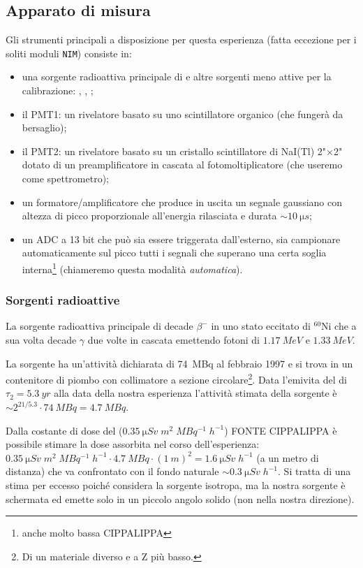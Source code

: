 \subsection{Apparato di misura}
Gli strumenti principali a disposizione per questa esperienza (fatta eccezione per i soliti moduli \texttt{NIM}) consiste in:
\begin{itemize}
	\item una sorgente radioattiva principale di \co\! e altre sorgenti meno attive per la calibrazione: \cs, \na, \am;
	\item il PMT1: un rivelatore basato su uno scintillatore organico (che fungerà da bersaglio);
	\item il PMT2: un rivelatore basato su un cristallo scintillatore di NaI(Tl) 2"$\times$2" dotato di un preamplificatore in cascata al fotomoltiplicatore (che useremo come spettrometro);
	\item un formatore/amplificatore che produce in uscita un segnale gaussiano con altezza di picco proporzionale all'energia rilasciata e durata $\sim \SI{10}{\micro s}$;
	\item un ADC a 13 bit che può sia essere triggerata dall'esterno, sia campionare automaticamente sul picco tutti i segnali che superano una certa soglia interna\footnote{anche molto bassa CIPPALIPPA} (chiameremo questa modalità \emph{automatica}).
\end{itemize}

\subsubsection{Sorgenti radioattive}
La sorgente radioattiva principale di \co\; decade $\beta^-$ in uno stato eccitato di $^{60}$Ni che a sua volta decade $\gamma$ due volte in cascata emettendo fotoni di $\SI{1.17}{MeV}$ e $\SI{1.33}{MeV}$.

La sorgente ha un'attività dichiarata di \SI{74}{MBq} al febbraio 1997 e si trova in un contenitore di piombo con collimatore a sezione circolare\footnote{Di un materiale diverso e a Z più basso.}. 
Data l'emivita del \co\; di $\tau_2 = \SI{5.3}{yr}$ alla data della nostra esperienza l'attività stimata della sorgente è $\sim 2^{21/5.3} \cdot \SI{74}{MBq} = \SI{4.7}{MBq}$.

Dalla costante di dose del \co\;  ($\SI{0.35}{\micro Sv\;m^2\;MBq^{-1}\;h^{-1}}$) FONTE CIPPALIPPA è possibile stimare la dose assorbita nel corso dell'esperienza: $\SI{0.35}{\micro Sv\;m^2\;MBq^{-1}\;h^{-1}} \cdot \SI{4.7}{MBq} \cdot (\SI{1}{m})^2= \SI{1.6}{\micro Sv\;h^{-1}}$ (a un metro di distanza) che va confrontato con il fondo naturale $\sim\SI{0.3}{\micro Sv\;h^{-1}}$. Si tratta di una stima per eccesso poiché considera la sorgente isotropa, ma la nostra sorgente è schermata ed emette solo in un piccolo angolo solido (non nella nostra direzione).

